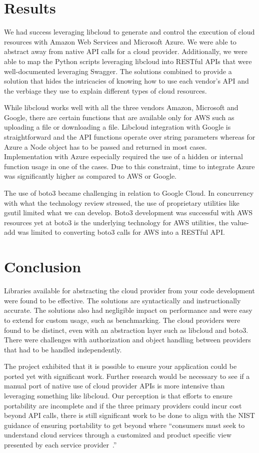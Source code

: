 \section{Results}
We had success leveraging libcloud to generate and control the execution of
cloud resources with Amazon Web Services and Microsoft Azure. We were able to
abstract away from native API calls for a cloud provider. Additionally, we were
able to map the Python scripts leveraging libcloud into RESTful APIs that were
well-documented leveraging Swagger. The solutions combined to provide a
solution that hides the intricacies of knowing how to use each vendor's API and
the verbiage they use to explain different types of cloud resources. 

While libcloud works well with all the three vendors Amazon, Microsoft and
Google,
there are certain functions that are available only for AWS such as uploading
a file or downloading a file. Libcloud integration with Google is
straightforward
and the API functions operate over string parameters whereas for Azure a Node
object has to be passed and returned in most cases. Implementation with Azure
especially required the use of a hidden or internal function usage in one of
the
cases. Due to this constraint, time to integrate Azure was significantly higher
as compared
to AWS or Google.

The use of boto3 became challenging in relation to Google Cloud. In concurrency
with what the technology review stressed, the
use of proprietary utilities like
gsutil limited what we can develop. Boto3 development was successful with AWS
resources yet at boto3 is the underlying technology for AWS utilities, the
value-add was limited to converting boto3 calls for AWS into a RESTful API.

\section{Conclusion}

Libraries available for abstracting the cloud provider from your code
development were found to be effective. The solutions are syntactically and
instructionally accurate. The solutions also had negligible impact on
performance and were easy to extend for custom usage, such as benchmarking.
The cloud providers were found to be distinct, even with an abstraction layer
such as libcloud and boto3. There were challenges with authorization and object
handling between providers that had to be handled independently. 

The project exhibited that it is possible to ensure your application could be
ported yet with significant work. Further research would be necessary to see if
a manual port of native use of cloud provider APIs is more intensive than
leveraging something like libcloud. Our perception is that efforts to ensure
portability are incomplete and if the three primary providers could incur cost
beyond API calls, there is still significant work to be done to align with the
NIST guidance of ensuring portability to get beyond where ``consumers must seek
to understand cloud services through a customized and product specific view
presented by each service provider~\cite{hid-sp18-518-NIST-293}.''

